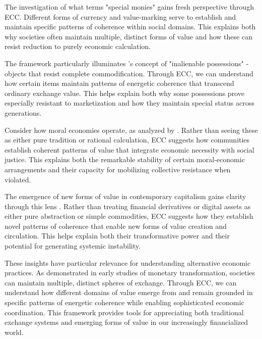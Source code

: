 The investigation of what \cite{zelizer1994social} terms "special monies" gains fresh perspective through ECC. Different forms of currency and value-marking serve to establish and maintain specific patterns of coherence within social domains. This explains both why societies often maintain multiple, distinct forms of value and how these can resist reduction to purely economic calculation.

The framework particularly illuminates \cite{weiner1992inalienable}'s concept of "inalienable possessions" - objects that resist complete commodification. Through ECC, we can understand how certain items maintain patterns of energetic coherence that transcend ordinary exchange value. This helps explain both why some possessions prove especially resistant to marketization and how they maintain special status across generations.

Consider how moral economies operate, as analyzed by \cite{thompson1971moral}. Rather than seeing these as either pure tradition or rational calculation, ECC suggests how communities establish coherent patterns of value that integrate economic necessity with social justice. This explains both the remarkable stability of certain moral-economic arrangements and their capacity for mobilizing collective resistance when violated.

The emergence of new forms of value in contemporary capitalism gains clarity through this lens \cite{appadurai1986social}. Rather than treating financial derivatives or digital assets as either pure abstraction or simple commodities, ECC suggests how they establish novel patterns of coherence that enable new forms of value creation and circulation. This helps explain both their transformative power and their potential for generating systemic instability.

These insights have particular relevance for understanding alternative economic practices. As \cite{bohannan1959impact} demonstrated in early studies of monetary transformation, societies can maintain multiple, distinct spheres of exchange. Through ECC, we can understand how different domains of value emerge from and remain grounded in specific patterns of energetic coherence while enabling sophisticated economic coordination. This framework provides tools for appreciating both traditional exchange systems and emerging forms of value in our increasingly financialized world.
